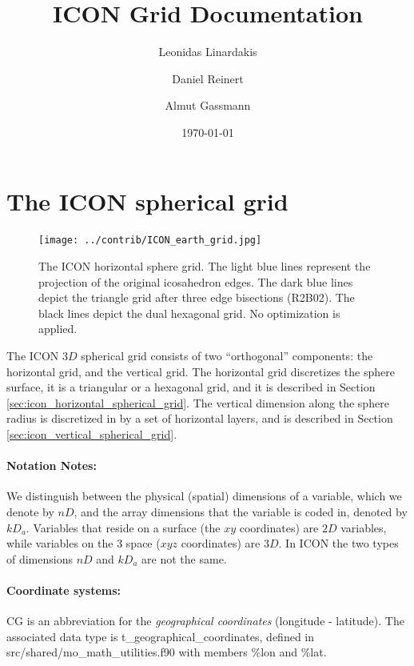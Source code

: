 \documentclass[a4paper,11pt,DIV16,BCOR1cm,titlepage]{scrartcl}
\title{\vspace{6cm}ICON Grid Documentation}
\author[1]{Leonidas Linardakis}
\author[2]{Daniel Reinert}
\author[1]{Almut Gassmann}
\affil[1]{Max-Planck-Institut f\"ur Meteorologie\\Bundesstr. 53\\D-20146 Hamburg\\Germany}
\affil[2]{Deutscher Wetterdienst\\Frankfurter Str. 135\\D-63067 Offenbach\\Germany}
\date{\vspace{8cm}\today}
\begin{document}
  

\maketitle  
  
\tableofcontents  
  
\newpage  

\section{The ICON spherical grid}
\label{sec:icon_spherical_grid}

\begin{figure}[!htd]
  \begin{center}
    \texttt{[image: ../contrib/ICON\_earth\_grid.jpg]}
  \end{center}
  \caption{The ICON horizontal sphere grid. The light blue lines represent the projection of
    the original icosahedron edges. The dark blue lines depict the triangle grid
  after three edge bisections (R2B02). The black lines depict the dual hexagonal grid. 
  No optimization is applied.}
  \label{fig:icon_earth_grid}
\end{figure}

The ICON $3D$ spherical grid consists of two ``orthogonal'' components:
the horizontal grid,  and the vertical grid. 
The horizontal grid  discretizes the sphere surface, 
it is a triangular or a hexagonal grid, and 
it is described in Section \ref{sec:icon_horizontal_spherical_grid}.
The vertical dimension along the sphere radius
is discretized in by a set of horizontal layers, 
and is described in Section \ref{sec:icon_vertical_spherical_grid}.


\paragraph{Notation Notes:}
We distinguish between the physical (spatial) dimensions of a variable, which we denote 
by $nD$,  and the array dimensions that the variable is coded in, denoted by $kD_a$.
Variables that reside on a surface (the $xy$ coordinates) are $2D$ variables, 
while variables on the 3 space ($xyz$ coordinates) are $3D$.
In ICON the two types of dimensions $nD$ and $kD_a$ are not the same.

\paragraph{Coordinate systems:}
CG is an abbreviation for the \emph{geographical coordinates} (longitude - latitude). 
The associated data type is t\_geographical\_coordinates, defined in 
\linebreak src/shared/mo\_math\_utilities.f90 with members \%lon and  \%lat.
\end{document}
